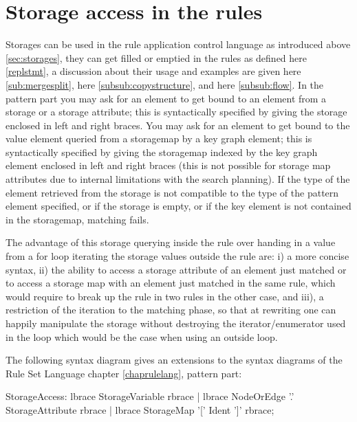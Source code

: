 \section{Storage access in the rules} \label{sub:storageaccess}

Storages can be used in the rule application control language as introduced above \ref{sec:storages}, they can get filled or emptied in the rules as defined here \ref{replstmt}, a discussion about their usage and examples are given here \ref{sub:mergesplit}, here \ref{subsub:copystructure}, and here \ref{subsub:flow}.
In the pattern part you may ask for an element to get bound to an element from a storage or a storage attribute;
this is syntactically specified by giving the storage enclosed in left and right braces.
You may ask for an element to get bound to the value element queried from a storagemap by a key graph element;
this is syntactically specified by giving the storagemap indexed by the key graph element enclosed in left and right braces
(this is not possible for storage map attributes due to internal limitations with the search planning).
If the type of the element retrieved from the storage is not compatible to the type of the pattern element specified,
or if the storage is empty, or if the key element is not contained in the storagemap, matching fails.

The advantage of this storage querying inside the rule over handing in a value from a for loop iterating the storage values outside the rule are: i) a more concise syntax, ii) the ability to access a storage attribute of an element just matched or to access a storage map with an element just matched in the same rule, which would require to break up the rule in two rules in the other case, and iii), a restriction of the iteration to the matching phase, so that at rewriting one can happily manipulate the storage without destroying the iterator/enumerator used in the loop which would be the case when using an outside loop.

The following syntax diagram gives an extensions to the syntax diagrams of the Rule Set Language chapter \ref{chaprulelang}, pattern part:
\begin{rail}
  StorageAccess:
    lbrace StorageVariable rbrace |
    lbrace NodeOrEdge '.' StorageAttribute rbrace |
    lbrace StorageMap '[' Ident ']' rbrace;
\end{rail}

